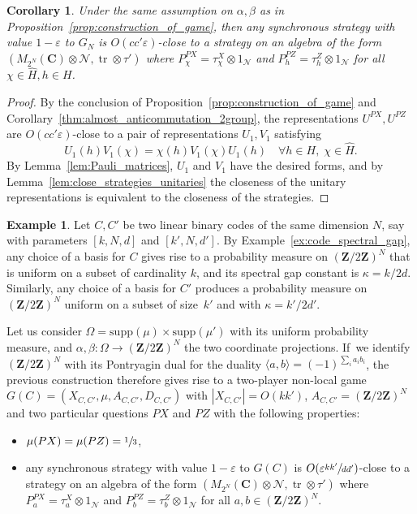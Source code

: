 \documentclass[JEP,XML,SOM,Unicode,published]{cedram}
\theoremstyle{plain}
\newtheorem{corollary}[theorem]{Corollary}
\theoremstyle{definition}
\newtheorem{example}[theorem]{Example}
\newcommand{\C}{\mathbf{C}}
\newcommand{\Z}{\mathbf{Z}}
\newcommand{\cN}{\mathcal{N}}
\DeclareMathOperator{\tr}{tr}
\begin{document}
\begin{corollary}\label{cor:pauli_from_good_strategy}
Under the same assumption on $\alpha,\beta$ as in Proposition~\ref{prop:construction_of_game}, then any synchronous strategy with value $1-\varepsilon$ to $G_N$ is $O(cc'\varepsilon)$-close to a strategy on an algebra of the form $(M_{2^N}(\C)\otimes \cN,\mathrm{\tr}\otimes \tau')$ where $P^{PX}_\chi = \tau^X_\chi\otimes 1_\cN$ and $P^{PZ}_h = \tau^Z_h\otimes 1_\cN$ for all $\chi \in\hat H, h\in H$.
\end{corollary}

\begin{proof}
By the conclusion of Proposition~\ref{prop:construction_of_game} and Corollary~\ref{thm:almost_anticommutation_2group}, the representations $U^{PX},U^{PZ}$ are $O(cc'\varepsilon)$-close to a pair of representations $U_1,V_1$ satisfying
\[
U_1(h) V_1(\chi) = \chi(h) V_1(\chi) U_1(h)\quad\forall h \in H,\;\chi \in \hat H.
\]
By Lemma~\ref{lem:Pauli_matrices}, $U_1$ and $V_1$ have the desired forms, and by Lemma~\ref{lem:close_strategies_unitaries} the closeness of the unitary representations is equivalent to the closeness of the strategies.
\end{proof}

\begin{example}\label{ex:game_from_code} Let $C,C'$ be two linear binary codes of the same dimension $N$, say with parameters $[k,N,d]$ and $[k',N,d']$. By Example~\ref{ex:code_spectral_gap}, any choice of a basis for $C$ gives rise to a probability measure on $(\Z/2\Z)^N$ that is uniform on a subset of cardinality $k$, and its spectral gap constant is $\kappa = k/2d$. Similarly, any choice of a basis for $C'$ produces a probability measure on $(\Z/2\Z)^N$ uniform on a subset of size~$k'$ and with $\kappa = k'/2d'$.

Let us consider $\Omega = \mathrm{supp}(\mu)\times \mathrm{supp}(\mu')$ with its uniform probability measure, and $\alpha,\beta:\Omega\to (\Z/2\Z)^N$ the two coordinate projections. If~we identify $(\Z/2\Z)^N$ with its Pontryagin dual for the duality $\langle a,b\rangle=(-1)^{\sum_i a_i b_i}$, the previous construction therefore gives rise to a two-player non-local game $G(C)=(X_{C,C'},\mu,A_{C,C'},D_{C,C'})$ with $|X_{C,C'}|=O(kk')$, $A_{C,C'}=(\Z/2\Z)^N$ and two particular questions $PX$ and $PZ$ with the following properties:
\begin{itemize}
\item $\mu(PX)=\mu(PZ)=\sfrac 1 3$,
\item any synchronous strategy with value $1-\varepsilon$ to $G(C)$ is $O(\varepsilon\sfrac{kk'}{dd'})$-close to a strategy on an algebra of the form $(M_{2^N}(\C)\otimes \cN,\mathrm{\tr}\otimes \tau')$ where $P^{PX}_a = \tau^X_a\otimes 1_\cN$ and $P^{PZ}_b = \tau^Z_b\otimes 1_\cN$ for all $a,b\in (\Z/2\Z)^N$.
\end{itemize}
\end{example}
\end{document}
